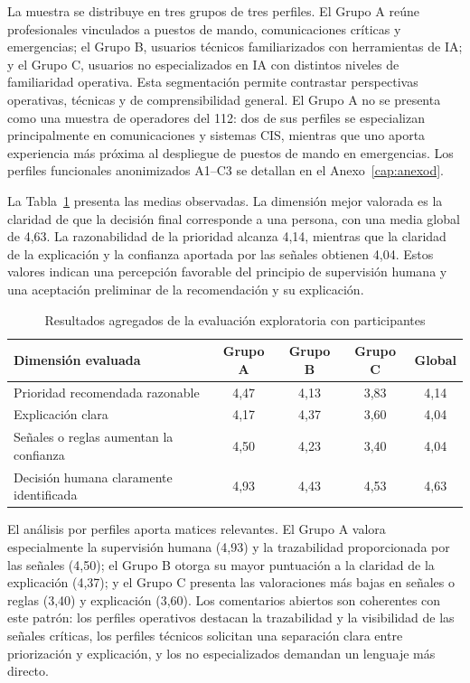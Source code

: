La muestra se distribuye en tres grupos de tres perfiles. El Grupo A reúne profesionales
vinculados a puestos de mando, comunicaciones críticas y emergencias; el Grupo B,
usuarios técnicos familiarizados con herramientas de IA; y el Grupo C, usuarios no
especializados en IA con distintos niveles de familiaridad operativa. Esta segmentación
permite contrastar perspectivas operativas, técnicas y de comprensibilidad general. El
Grupo A no se presenta como una muestra de operadores del 112: dos de sus perfiles se
especializan principalmente en comunicaciones y sistemas CIS, mientras que uno aporta
experiencia más próxima al despliegue de puestos de mando en emergencias. Los perfiles
funcionales anonimizados A1--C3 se detallan en el Anexo~\ref{cap:anexod}.

La Tabla~\ref{tab:9-evaluacion-exploratoria} presenta las medias observadas. La dimensión
mejor valorada es la claridad de que la decisión final corresponde a una persona, con
una media global de 4,63. La razonabilidad de la prioridad alcanza 4,14,
mientras que la claridad de la explicación y la confianza aportada por las señales
obtienen 4,04. Estos valores indican una percepción favorable del principio de
supervisión humana y una aceptación preliminar de la recomendación y su explicación.

\begin{table}[htbp]
\centering
\caption{Resultados agregados de la evaluación exploratoria con participantes}
\label{tab:9-evaluacion-exploratoria}
\small
\begin{tabularx}{\textwidth}{|X|c|c|c|c|}
\hline
\textbf{Dimensión evaluada} & \textbf{Grupo A} & \textbf{Grupo B} & \textbf{Grupo C} & \textbf{Global} \\ \hline
Prioridad recomendada razonable & 4,47 & 4,13 & 3,83 & 4,14 \\ \hline
Explicación clara & 4,17 & 4,37 & 3,60 & 4,04 \\ \hline
Señales o reglas aumentan la confianza & 4,50 & 4,23 & 3,40 & 4,04 \\ \hline
Decisión humana claramente identificada & 4,93 & 4,43 & 4,53 & 4,63 \\ \hline
\end{tabularx}
\end{table}

El análisis por perfiles aporta matices relevantes. El Grupo A valora especialmente la
supervisión humana (4,93) y la trazabilidad proporcionada por las señales
(4,50); el Grupo B otorga su mayor puntuación a la claridad de la explicación
(4,37); y el Grupo C presenta las valoraciones más bajas en señales o reglas
(3,40) y explicación (3,60). Los comentarios abiertos son coherentes con
este patrón: los perfiles operativos destacan la trazabilidad y la visibilidad de las
señales críticas, los perfiles técnicos solicitan una separación clara entre
priorización y explicación, y los no especializados demandan un lenguaje más directo.

